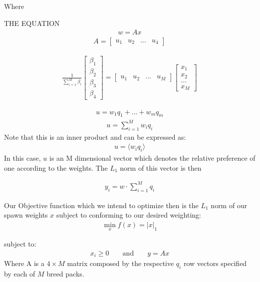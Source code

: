 \documentclass[12pt]{article}
\begin{document}
Where 

THE EQUATION
\begin{align*}
w = Ax
\end{align*}
\begin{align*}
A = \begin{bmatrix}
u_1 & u_2 & ... & u_4
\end{bmatrix}
\end{align*}

\begin{align*}
\frac{1}{\sum_{i=1}^{M} \beta_i} \begin{bmatrix} \beta_1 \\ \beta_2 \\ \beta_3 \\ \beta_4 \end{bmatrix} = \begin{bmatrix}
u_1 & u_2 & ... & u_M
\end{bmatrix} \begin{bmatrix}
x_1 \\ x_2 \\ ... \\ x_M
\end{bmatrix}
\end{align*}




\begin{align*}
u = w_1 q_1 + ... + w_m q_m 
\end{align*}
\begin{align*}
u = \sum_{i=1}^{M} w_i q_i
\end{align*}
Note that this is an inner product and can be expressed as:
\begin{align*}
u = \langle w_i q_i \rangle
\end{align*}
In this case, $u$ is an M dimensional vector which denotes the relative preference of one according to the weights. The $L_1$ norm of this vector is then 



\begin{align*}
y_i = w \cdot \sum_{i=1}^{M} q_i
\end{align*}

Our Objective function which we intend to optimize then is the $L_1$ norm of our spawn weights $x$ subject to conforming to our desired weighting:
\begin{align*}
\min_{x} f(x) = |x|_1
\end{align*}

subject to:
\begin{align*}
x_i \geq 0 && \text{ and } && y = Ax
\end{align*}
Where A is a $4 \times M$ matrix composed by the respective $q_i$ row vectors specified by each of $M$ breed packs.
\end{document}
